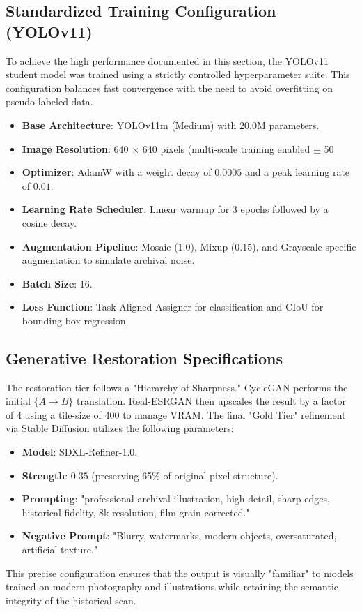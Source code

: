 \documentclass[12pt,onecolumn,a4paper]{IEEEtran}
\begin{document}
\subsection{Standardized Training Configuration (YOLOv11)}
To achieve the high performance documented in this section, the YOLOv11 student model was trained using a strictly controlled hyperparameter suite. This configuration balances fast convergence with the need to avoid overfitting on pseudo-labeled data.

\begin{itemize}
    \item \textbf{Base Architecture}: YOLOv11m (Medium) with 20.0M parameters.
    \item \textbf{Image Resolution}: 640 $\times$ 640 pixels (multi-scale training enabled $\pm$ 50%
    \item \textbf{Optimizer}: AdamW with a weight decay of $0.0005$ and a peak learning rate of $0.01$.
    \item \textbf{Learning Rate Scheduler}: Linear warmup for 3 epochs followed by a cosine decay.
    \item \textbf{Augmentation Pipeline}: Mosaic ($1.0$), Mixup ($0.15$), and Grayscale-specific augmentation to simulate archival noise.
    \item \textbf{Batch Size}: 16.
    \item \textbf{Loss Function}: Task-Aligned Assigner for classification and CIoU for bounding box regression.
\end{itemize}

\subsection{Generative Restoration Specifications}
The restoration tier follows a "Hierarchy of Sharpness." CycleGAN performs the initial $\{A \rightarrow B\}$ translation. Real-ESRGAN then upscales the result by a factor of 4 using a tile-size of 400 to manage VRAM. The final "Gold Tier" refinement via Stable Diffusion utilizes the following parameters:
\begin{itemize}
    \item \textbf{Model}: SDXL-Refiner-1.0.
    \item \textbf{Strength}: $0.35$ (preserving 65\% of original pixel structure).
    \item \textbf{Prompting}: "professional archival illustration, high detail, sharp edges, historical fidelity, 8k resolution, film grain corrected."
    \item \textbf{Negative Prompt}: "Blurry, watermarks, modern objects, oversaturated, artificial texture."
\end{itemize}
This precise configuration ensures that the output is visually "familiar" to models trained on modern photography and illustrations while retaining the semantic integrity of the historical scan.
\end{document}
